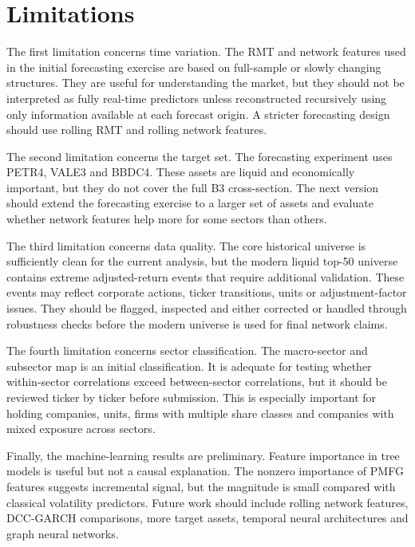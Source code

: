 \section{Limitations}
\label{sec:limitations}

The first limitation concerns time variation. The RMT and network features used in the initial forecasting exercise are based on full-sample or slowly changing structures. They are useful for understanding the market, but they should not be interpreted as fully real-time predictors unless reconstructed recursively using only information available at each forecast origin. A stricter forecasting design should use rolling RMT and rolling network features.

The second limitation concerns the target set. The forecasting experiment uses PETR4, VALE3 and BBDC4. These assets are liquid and economically important, but they do not cover the full B3 cross-section. The next version should extend the forecasting exercise to a larger set of assets and evaluate whether network features help more for some sectors than others.

The third limitation concerns data quality. The core historical universe is sufficiently clean for the current analysis, but the modern liquid top-50 universe contains extreme adjusted-return events that require additional validation. These events may reflect corporate actions, ticker transitions, units or adjustment-factor issues. They should be flagged, inspected and either corrected or handled through robustness checks before the modern universe is used for final network claims.

The fourth limitation concerns sector classification. The macro-sector and subsector map is an initial classification. It is adequate for testing whether within-sector correlations exceed between-sector correlations, but it should be reviewed ticker by ticker before submission. This is especially important for holding companies, units, firms with multiple share classes and companies with mixed exposure across sectors.

Finally, the machine-learning results are preliminary. Feature importance in tree models is useful but not a causal explanation. The nonzero importance of PMFG features suggests incremental signal, but the magnitude is small compared with classical volatility predictors. Future work should include rolling network features, DCC-GARCH comparisons, more target assets, temporal neural architectures and graph neural networks.
